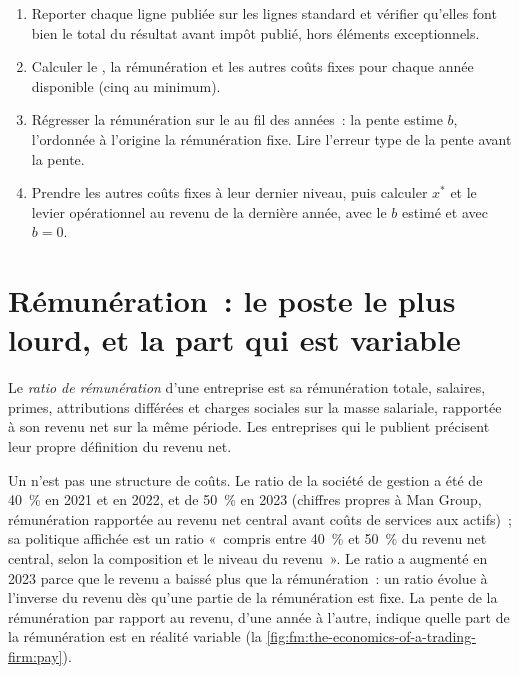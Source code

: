 \begin{method}\label{met:fm:the-economics-of-a-trading-firm:read}
\begin{enumerate}
\item Reporter chaque ligne publiée sur les lignes standard et vérifier qu'elles font bien le total du résultat avant impôt publié, hors éléments exceptionnels.
\item Calculer le , la rémunération et les autres coûts fixes pour chaque année disponible (cinq au minimum).
\item Régresser la rémunération sur le  au fil des années~: la pente estime $b$, l'ordonnée à l'origine la rémunération fixe. Lire l'erreur type de la pente avant
la pente.
\item Prendre les autres coûts fixes à leur dernier niveau, puis calculer $x^\ast$ et le levier opérationnel au revenu de la dernière année, avec le
$b$ estimé et avec $b=0$.
\end{enumerate}
\end{method}

\section{Rémunération~: le poste le plus lourd, et la part qui est variable}

\begin{definition}\label{def:fm:the-economics-of-a-trading-firm:comp}
Le \emph{ratio de rémunération} d'une entreprise est sa rémunération totale, salaires, primes, attributions différées et charges sociales sur la masse salariale, rapportée
à son revenu net sur la même période. Les entreprises qui le publient précisent leur propre définition du revenu net.
\end{definition}

Un  n'est pas une structure de coûts. Le ratio de la société de gestion a été de 40~\% en 2021 et en 2022, et de 50~\% en 2023 (chiffres propres à Man Group,
rémunération rapportée au revenu net central avant coûts de services aux actifs)~; sa politique affichée est un ratio «~compris entre 40~\% et 50~\% du revenu net central, selon la
composition et le niveau du revenu~». Le ratio a augmenté en 2023 parce que le revenu a baissé plus que la rémunération~: un ratio évolue à l'inverse du revenu dès qu'une partie de la rémunération est
fixe. La pente de la rémunération par rapport au revenu, d'une année à l'autre, indique quelle part de la rémunération est en réalité variable
(la \cref{fig:fm:the-economics-of-a-trading-firm:pay}).

